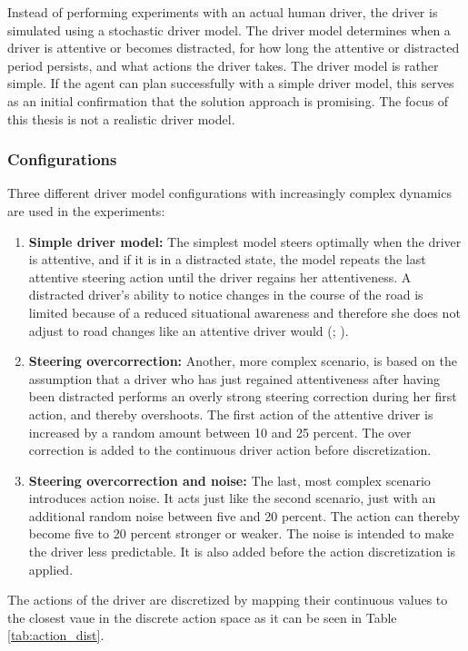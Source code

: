 Instead of performing experiments with an actual human driver, the driver is simulated using a stochastic driver model. The driver model determines when a driver is attentive or becomes distracted, for how long the attentive or distracted period persists, and what actions the driver takes. The driver model is rather simple. If the agent can plan successfully with a simple driver model, this serves as an initial confirmation that the solution approach is promising. The focus of this thesis is not a realistic driver model.


\subsubsection{Configurations}
\label{sec:driver_model_config}

Three different driver model configurations with increasingly complex dynamics are used in the experiments:
\begin{enumerate}
    \item \textbf{Simple driver model:} The simplest model steers optimally when the driver is attentive, and if it is in a distracted state, the model repeats the last attentive steering action until the driver regains her attentiveness. A distracted driver's ability to notice changes in the course of the road is limited because of a reduced situational awareness and therefore she does not adjust to road changes like an attentive driver would (\cite{driver-awareness}; \cite{driver-awareness2}).
    \item \textbf{Steering overcorrection:} Another, more complex scenario, is based on the assumption that a driver who has just regained attentiveness after having been distracted performs an overly strong steering correction during her first action, and thereby overshoots. The first action of the attentive driver is increased by a random amount between 10 and 25 percent. The over correction is added to the continuous driver action before discretization.
    \item \textbf{Steering overcorrection and noise:} The last, most complex scenario introduces action noise. It acts just like the second scenario, just with an additional random noise between five and 20 percent. The action can thereby become five to 20 percent stronger or weaker. The noise is intended to make the driver less predictable. It is also added before the action discretization is applied.
\end{enumerate}
\label{sec:driver_act_discr}
The actions of the driver are discretized by mapping their continuous values to the closest vaue in the discrete action space as it can be seen in Table \ref{tab:action_dist}.


